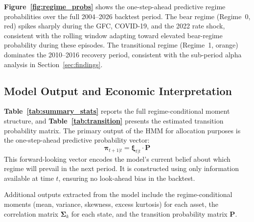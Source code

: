 \documentclass[12pt, a4paper]{article}
\begin{document}
\textbf{Figure~\ref{fig:regime_probs}} shows the one-step-ahead predictive regime probabilities over the full 2004--2026 backtest period. The bear regime (Regime~0, red) spikes sharply during the GFC, COVID-19, and the 2022 rate shock, consistent with the rolling window adapting toward elevated bear-regime probability during these episodes. The transitional regime (Regime~1, orange) dominates the 2010--2016 recovery period, consistent with the sub-period alpha analysis in Section~\ref{sec:findings}.

\subsection{Model Output and Economic Interpretation}

\textbf{Table~\ref{tab:summary_stats}} reports the full regime-conditional moment structure, and \textbf{Table~\ref{tab:transition}} presents the estimated transition probability matrix. The primary output of the HMM for allocation purposes is the one-step-ahead predictive
probability vector:
\begin{equation}
  \boldsymbol{\pi}_{t+1|t} = \boldsymbol{\xi}_{t|t} \cdot \mathbf{P}
  \label{eq:predictive}
\end{equation}
This forward-looking vector encodes the model's current belief about which regime will
prevail in the next period. It is constructed using only information available at time $t$,
ensuring no look-ahead bias in the backtest.

Additional outputs extracted from the model include the regime-conditional moments (mean,
variance, skewness, excess kurtosis) for each asset, the correlation matrix
$\boldsymbol{\Sigma}_k$ for each state, and the transition probability matrix $\mathbf{P}$.
\end{document}
